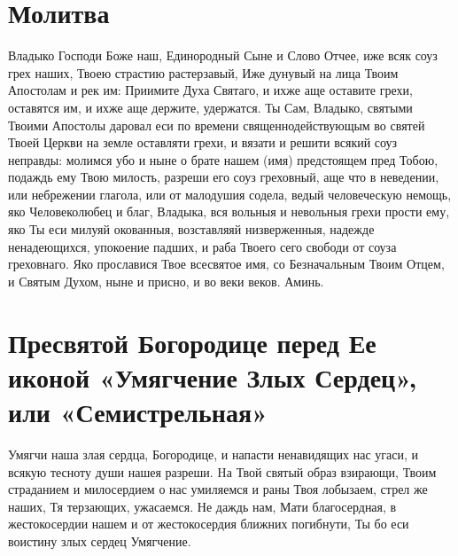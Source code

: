  

\section{Молитва }
 




Владыко Господи Боже наш, Единородный Сыне и Слово Отчее, иже всяк соуз грех наших, Твоею страстию растерзавый, Иже дунувый на лица Твоим Апостолам и рек им: Приимите Духа Святаго, и ихже аще оставите грехи, оставятся им, и ихже аще держите, удержатся. Ты Сам, Владыко, святыми Твоими Апостолы даровал еси по времени священнодействующым во святей Твоей Церкви на земле оставляти грехи, и вязати и решити всякий соуз неправды: молимся убо и ныне о брате нашем (имя) предстоящем пред Тобою, подаждь ему Твою милость, разреши его соуз греховный, аще что в неведении, или небрежении глагола, или от малодушия содела, ведый человеческую немощь, яко Человеколюбец и благ, Владыка, вся вольныя и невольныя грехи прости ему, яко Ты еси милуяй окованныя, возставляяй низверженныя, надежде ненадеющихся, упокоение падших, и раба Твоего сего свободи от соуза греховнаго. Яко прославися Твое всесвятое имя, со Безначальным Твоим Отцем, и Святым Духом, ныне и присно, и во веки веков. Аминь.
\mychapterending


 

\section{Пресвятой Богородице перед Ее иконой «Умягчение Злых Сердец», или  «Семистрельная»}
 



Умягчи наша злая сердца, Богородице, и напасти ненавидящих нас угаси, и всякую тесноту души нашея разреши. Hа Твой святый образ взирающи, Твоим страданием и милосердием о нас умиляемся и раны Твоя лобызаем, стрел же наших, Тя терзающих, ужасаемся. Не даждь нам, Мати благосердная, в жестокосердии нашем и от жестокосердия ближних погибнути, Ты бо еси воистину злых сердец Умягчение.




